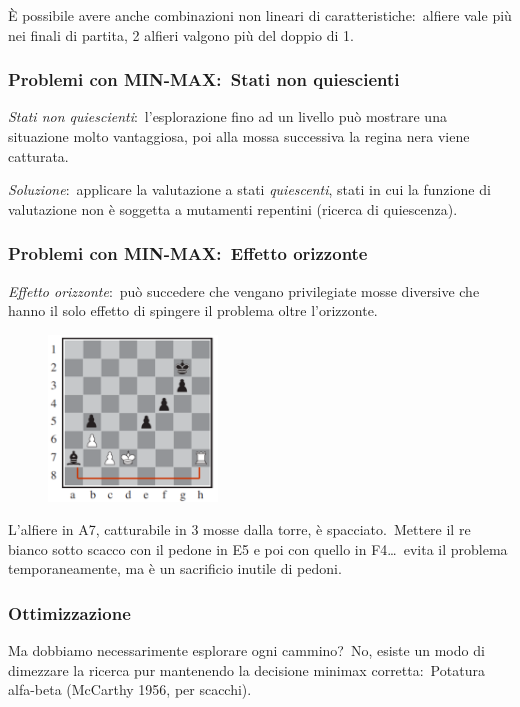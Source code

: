 \noindent È possibile avere anche combinazioni non lineari di caratteristiche:\ alfiere vale più nei finali di partita, 2 alfieri valgono più del doppio di 1.

\subsubsection{Problemi con MIN-MAX:\ Stati non quiescienti}
\textit{Stati non quiescienti}:\ l'esplorazione fino ad un livello può mostrare una situazione molto vantaggiosa, poi alla mossa successiva la regina nera viene catturata.\

\textit{Soluzione}:\ applicare la valutazione a stati \textit{quiescenti}, stati in cui la funzione di valutazione non è soggetta a mutamenti repentini (ricerca di quiescenza).\

\subsubsection{Problemi con MIN-MAX:\ Effetto orizzonte}
\textit{Effetto orizzonte}:\ può succedere che vengano privilegiate mosse diversive che hanno il solo effetto di spingere il problema oltre l'orizzonte.\

\begin{figure}[H]
	\centering
	\includegraphics[width=0.4\textwidth]{immagini/EffettoOrizzonte.png}
\end{figure}

\noindent L'alfiere in A7, catturabile in 3 mosse dalla torre, è spacciato.\
Mettere il re bianco sotto scacco con il pedone in E5 e poi con quello in F4\dots\ evita il problema temporaneamente, ma è un sacrificio inutile di pedoni.\

\subsubsection{Ottimizzazione}
Ma dobbiamo necessarimente esplorare ogni cammino?\
No, esiste un modo di dimezzare la ricerca pur mantenendo la decisione minimax corretta:\ Potatura alfa-beta (McCarthy 1956, per scacchi).

